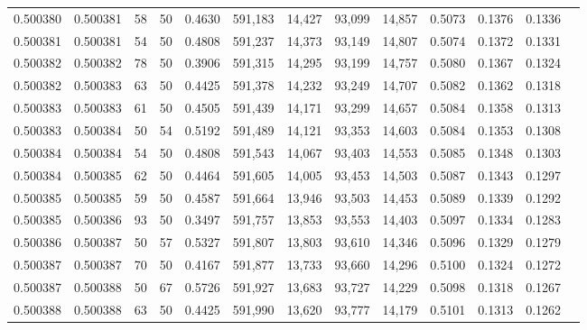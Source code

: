 \begin{tabular}{rrrrrrrrrrrrr}
0.500380 & 0.500381 &    58 &  50 &                                     0.4630 & 591,183 &  14,427 &  93,099 &  14,857 & 0.5073 & 0.1376 & 0.1336 \\
0.500381 & 0.500381 &    54 &  50 &                                     0.4808 & 591,237 &  14,373 &  93,149 &  14,807 & 0.5074 & 0.1372 & 0.1331 \\
0.500382 & 0.500382 &    78 &  50 &                                     0.3906 & 591,315 &  14,295 &  93,199 &  14,757 & 0.5080 & 0.1367 & 0.1324 \\
0.500382 & 0.500383 &    63 &  50 &                                     0.4425 & 591,378 &  14,232 &  93,249 &  14,707 & 0.5082 & 0.1362 & 0.1318 \\
0.500383 & 0.500383 &    61 &  50 &                                     0.4505 & 591,439 &  14,171 &  93,299 &  14,657 & 0.5084 & 0.1358 & 0.1313 \\
0.500383 & 0.500384 &    50 &  54 &                                     0.5192 & 591,489 &  14,121 &  93,353 &  14,603 & 0.5084 & 0.1353 & 0.1308 \\
0.500384 & 0.500384 &    54 &  50 &                                     0.4808 & 591,543 &  14,067 &  93,403 &  14,553 & 0.5085 & 0.1348 & 0.1303 \\
0.500384 & 0.500385 &    62 &  50 &                                     0.4464 & 591,605 &  14,005 &  93,453 &  14,503 & 0.5087 & 0.1343 & 0.1297 \\
0.500385 & 0.500385 &    59 &  50 &                                     0.4587 & 591,664 &  13,946 &  93,503 &  14,453 & 0.5089 & 0.1339 & 0.1292 \\
0.500385 & 0.500386 &    93 &  50 &                                     0.3497 & 591,757 &  13,853 &  93,553 &  14,403 & 0.5097 & 0.1334 & 0.1283 \\
0.500386 & 0.500387 &    50 &  57 &                                     0.5327 & 591,807 &  13,803 &  93,610 &  14,346 & 0.5096 & 0.1329 & 0.1279 \\
0.500387 & 0.500387 &    70 &  50 &                                     0.4167 & 591,877 &  13,733 &  93,660 &  14,296 & 0.5100 & 0.1324 & 0.1272 \\
0.500387 & 0.500388 &    50 &  67 &                                     0.5726 & 591,927 &  13,683 &  93,727 &  14,229 & 0.5098 & 0.1318 & 0.1267 \\
0.500388 & 0.500388 &    63 &  50 &                                     0.4425 & 591,990 &  13,620 &  93,777 &  14,179 & 0.5101 & 0.1313 & 0.1262 \\

\end{tabular}
